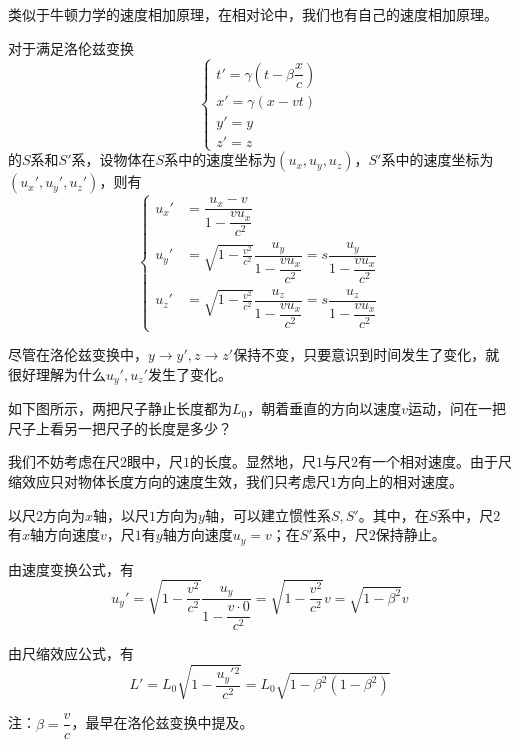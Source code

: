\subsection[速度变换]{}
类似于牛顿力学的速度相加原理，在相对论中，我们也有自己的速度相加原理。
\begin{law}
	对于满足洛伦兹变换
	\[\left\{\begin{array}{l}
		t'=\gamma(t-\beta\dfrac{x}{c})\\
		x'=\gamma(x-vt)\\
		y'=y\\
		z'=z
	\end{array}\right.\]
	的$S$系和$S'$系，设物体在$S$系中的速度坐标为$(u_x,u_y,u_z)$，$S'$系中的速度坐标为$(u_x',u_y',u_z')$，则有
    \[
    \left\{\begin{aligned}
    	u_x'&=\dfrac{u_x-v}{1-\dfrac{vu_x}{c^2}}\\[1ex]
    	u_y'&=\sqrt{1-\frac{v^2}{c^2}}\dfrac{u_y}{1-\dfrac{vu_x}{c^2}}=s\dfrac{u_y}{1-\dfrac{vu_x}{c^2}}\\[1ex]
    	u_z'&=\sqrt{1-\frac{v^2}{c^2}}\dfrac{u_z}{1-\dfrac{vu_x}{c^2}}=s\dfrac{u_z}{1-\dfrac{vu_x}{c^2}}
    \end{aligned}\right.
    \]
\end{law}
尽管在洛伦兹变换中，$y\rightarrow y',z\rightarrow z'$保持不变，只要意识到时间发生了变化，就很好理解为什么$u_y',u_z'$发生了变化。
\begin{ex}
如下图所示，两把尺子静止长度都为$L_0$，朝着垂直的方向以速度$v$运动，问在一把尺子上看另一把尺子的长度是多少？  
\end{ex}
\begin{so}
	
	我们不妨考虑在尺$2$眼中，尺$1$的长度。显然地，尺$1$与尺$2$有一个相对速度。由于尺缩效应只对物体长度方向的速度生效，我们只考虑尺$1$方向上的相对速度。
	
	以尺$2$方向为$x$轴，以尺$1$方向为$y$轴，可以建立惯性系$S,S'$。其中，在$S$系中，尺$2$有$x$轴方向速度$v$，尺$1$有$y$轴方向速度$u_y=v$；在$S'$系中，尺$2$保持静止。
	
	由速度变换公式，有
	\[u_y'=\sqrt{1-\dfrac{v^2}{c^2}}\dfrac{u_y}{1-\dfrac{v\cdot 0}{c^2}}=\sqrt{1-\dfrac{v^2}{c^2}}v=\sqrt{1-\beta^2}v\]
    
    由尺缩效应公式，有
    \[L'=L_0\sqrt{1-\dfrac{u_y'{}^2}{c^2}}=L_0\sqrt{1-\beta^2(1-\beta^2)}\]
    
    注：$\beta=\dfrac{v}{c}$，最早在洛伦兹变换中提及。

\end{so}
